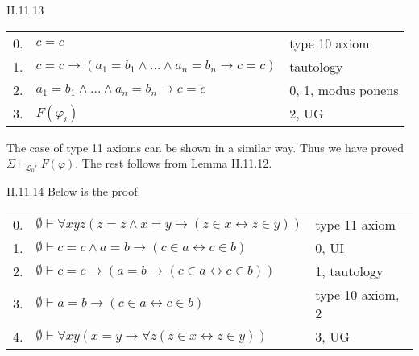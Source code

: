 \documentclass[12pt]{article}
\begin{document}
\begin{customthm}{II.11.13}
  \begin{center}
    \begin{tabular}{lll}
      0. & $c=c$ & type 10 axiom \\
      1. & $c=c\rightarrow(a_1=b_1\wedge\ldots\wedge a_n=b_n\rightarrow c=c)$ & tautology \\
      2. & $a_1=b_1\wedge\ldots\wedge a_n=b_n\rightarrow c=c$ & 0, 1, modus ponens \\
      3. & $F(\varphi_i)$ & 2, UG
    \end{tabular}
  \end{center}
  The case of type 11 axioms can be shown in a similar way. Thus we have proved $\Sigma\vdash_{\mathcal{L}_0'}F(\varphi)$. The rest follows from Lemma II.11.12.
\end{customthm}

\begin{customthm}{II.11.14}
  Below is the proof.
  \begin{center}
    \begin{tabular}{lll}
      0. & $\emptyset\vdash\forall xyz(z=z\wedge x=y\rightarrow(z\in x\leftrightarrow z\in y))$ & type 11 axiom \\
      1. & $\emptyset\vdash c=c\wedge a=b\rightarrow(c\in a\leftrightarrow c\in b)$ & 0, UI \\
      2. & $\emptyset\vdash c=c\rightarrow(a=b\rightarrow(c\in a\leftrightarrow c\in b))$ & 1, tautology \\
      3. & $\emptyset\vdash a=b\rightarrow(c\in a\leftrightarrow c\in b)$ & type 10 axiom, 2 \\
      4. & $\emptyset\vdash\forall xy(x=y\rightarrow\forall z(z\in x\leftrightarrow z\in y))$ & 3, UG
    \end{tabular}
  \end{center}
\end{customthm}
\end{document}
